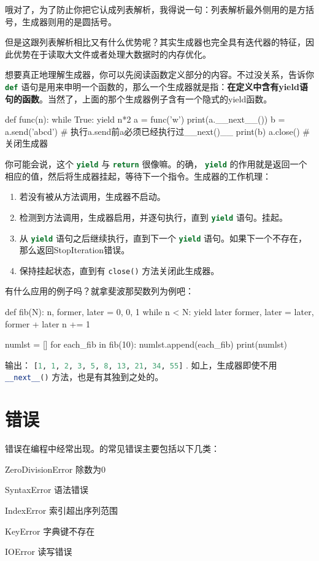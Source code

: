 \documentclass[a4paper,12pt]{report}
\newcommand{\pyline}[1]{{ \lstinline[language=Python, basicstyle=\ttfamily]{#1} }}
\newcommand{\python}{{\ttfamily{Python}}}
\newcommand{\qd}[1]{{\bfseries{#1}}}	%
\newcommand{\mytt}[1]{{\ttfamily{#1}}}
\newenvironment{fead}{\begin{description}[font=\bfseries\uline]}
    {\end{description}}
\newenvironment{feae}{\begin{enumerate}[font=\bfseries,labelindent=0pt]}
    {\end{enumerate}}
\begin{document}
哦对了，为了防止你把它认成列表解析，我得说一句：列表解析最外侧用的是方括号，生成器则用的是圆括号。

但是这跟列表解析相比又有什么优势呢？其实生成器也完全具有迭代器的特征，因此优势在于读取大文件或者处理大数据时的内存优化。

想要真正地理解生成器，你可以先阅读函数定义部分的内容。不过没关系，告诉你\pyline{def}语句是用来申明一个函数的，那么一个生成器就是指：\qd{在定义中含有yield语句的函数}。当然了，上面的那个生成器例子含有一个隐式的yield函数。
\begin{py}
def func(n):
    while True:
        yield n*2 
a = func('w')
print(a.__next__())
b = a.send('abcd')  # 执行a.send前a必须已经执行过__next()__
print(b)
a.close() # 关闭生成器
\end{py}

你可能会说，这个\pyline{yield}与\pyline{return}很像嘛。的确，\pyline{yield}的作用就是返回一个相应的值，然后将生成器挂起，等待下一个指令。生成器的工作机理：
\begin{feae}
\item 若没有被从\mytt{\_\_next\_\_()}方法调用，生成器不启动。
\item 检测到\mytt{\_\_next\_\_()}方法调用，生成器启用，并逐句执行，直到\pyline{yield}语句。挂起。
\item 从\pyline{yield}语句之后继续执行，直到下一个\pyline{yield}语句。如果下一个不存在，那么返回StopIteration错误。
\item 保持挂起状态，直到有\pyline{close()}方法关闭此生成器。
\end{feae}

有什么应用的例子吗？就拿斐波那契数列为例吧：
\begin{py}
def fib(N):
    n, former, later = 0, 0, 1
    while n < N:
        yield later
        former, later = later, former + later
        n += 1

numlst = []    
for each_fib in fib(10):
    numlst.append(each_fib)
print(numlst)
\end{py}
输出：\pyline{[1, 1, 2, 3, 5, 8, 13, 21, 34, 55]}. 如上，生成器即使不用\pyline{__next__()}方法，也是有其独到之处的。

\chapter{错误}
错误在编程中经常出现。\python 的常见错误主要包括以下几类：
\begin{fead}
\item[ZeroDivisionError] 除数为0
\item[SyntaxError] 语法错误
\item[IndexError] 索引超出序列范围
\item[KeyError] 字典键不存在
\item[IOError] 读写错误
\end{fead}
\end{document}
